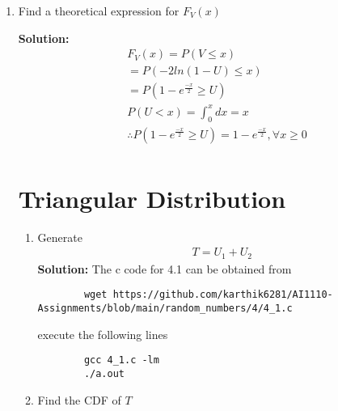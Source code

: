 \documentclass[journal,12pt,twocolumn]{IEEEtran}
\newcommand{\solution}{\noindent \textbf{Solution: }}
\numberwithin{equation}{section}
\renewcommand\thesection{\arabic{section}}
\begin{document}
\begin{enumerate}[label=\thesection.\arabic*,ref=\thesection.\theenumi]
	\item Find a theoretical expression for $F_V(x)$
	
	\solution \begin{align}
 &F_{V}(x)=P(V \leq x)\\
 &=P(-2 ln(1-U) \leq x)\\
 &=P(1-e^{\frac{-x}{2}} \geq U)\\
 &P(U<x)=\int_{0}^{x} dx=x\\
 &\therefore P(1-e^{\frac{-x}{2}} \geq U)=1-e^{\frac{-x}{2}}, \forall x\geq 0 \\ 
 \nonumber
 \end{align}
	
	\section{Triangular Distribution}
	\begin{enumerate}[label=\thesection.\arabic*,ref=\thesection.\theenumi]
	\item Generate 
	\begin{align}
		T = U_1+U_2
	\end{align}
	\solution The c code for 4.1 can be obtained from
	\begin{lstlisting}
		wget https://github.com/karthik6281/AI1110-Assignments/blob/main/random_numbers/4/4_1.c
	\end{lstlisting}
	execute the following lines
	\begin{lstlisting}
		gcc 4_1.c -lm
		./a.out
	\end{lstlisting}
	
	\item Find the CDF of $T$
	

\end{enumerate}
\end{enumerate}
\end{document}
